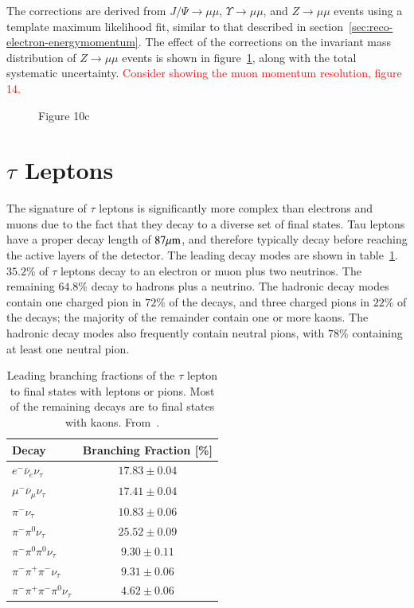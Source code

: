 The corrections are derived from $J/\Psi\rightarrow\mu\mu$, $\Upsilon\rightarrow\mu\mu$, and $Z\rightarrow\mu\mu$ events using a template maximum likelihood fit, similar to that described in section~\ref{sec:reco-electron-energymomentum}. The effect of the corrections on the invariant mass distribution of $Z\rightarrow\mu\mu$ events is shown in figure~\ref{fig:reco-muon-momentum-corrections}, along with the total systematic uncertainty. \textcolor{red}{Consider showing the muon momentum resolution, figure 14.}

\begin{figure}
	Figure 10c
	\label{fig:reco-muon-momentum-corrections}
\end{figure}



\section{$\tau$ Leptons}\label{sec:event-reconstruction-taus}
The signature of $\tau$ leptons is significantly more complex than electrons and muons due to the fact that they decay to a diverse set of final states. Tau leptons have a proper decay length of $87 \mu\mathrm{m}$, and therefore typically decay before reaching the active layers of the detector. The leading decay modes are shown in table~\ref{table:reco-tau-decays}. $35.2\%$ of $\tau$ leptons decay to an electron or muon plus two neutrinos. The remaining $64.8\%$ decay to hadrons plus a neutrino. The hadronic decay modes contain one charged pion in $72\%$ of the decays, and three charged pions in $22\%$ of the decays; the majority of the remainder contain one or more kaons. The hadronic decay modes also frequently contain neutral pions, with $78\%$ containing at least one neutral pion. 


\begin{table}[htbp]
	\centering
	\begin{tabular}{|l|c|}
		\hline
		Decay & Branching Fraction [\%] \\
		\hline
		$e^- \overline{\nu}_e \nu_{\tau}$ & $17.83 \pm 0.04$ \\
		\hline
		$\mu^- \overline{\nu}_{\mu} \nu_{\tau}$ & $17.41 \pm 0.04$ \\
		\hline
		$\pi^- \nu_{\tau}$ & $10.83 \pm 0.06$ \\
		\hline
		$\pi^- \pi^0 \nu_{\tau}$ & $25.52 \pm 0.09$ \\
		\hline
		$\pi^- \pi^0\pi^0\nu_{\tau}$ & $ 9.30 \pm 0.11$ \\
		\hline
		$\pi^-\pi^+\pi^-\nu_{\tau}$ & $9.31 \pm 0.06$ \\
		\hline
		$\pi^-\pi^+\pi^-\pi^0\nu_{\tau}$ & $4.62 \pm 0.06$ \\
		\hline
	\end{tabular}
	\caption{Leading branching fractions of the $\tau$ lepton to final states with leptons or pions. Most of the remaining decays are to final states with kaons. From~\cite{pdg-tau}.}
	\label{table:reco-tau-decays}
\end{table}

